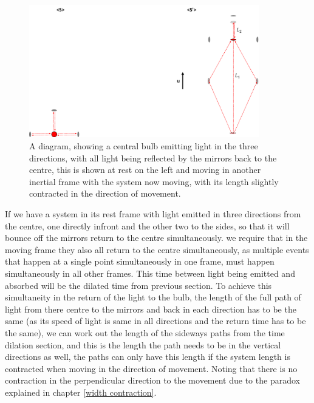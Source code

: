 \begin{figure}[H]
	\centering
	\includegraphics[width=10cm]{images/pdf/Length_Contraction.pdf}
	\caption{A diagram, showing a central bulb emitting light in the three directions, with all light being reflected by the mirrors back to the centre, this is shown at rest on the left and moving in another inertial frame with the system now moving, with its length slightly contracted in the direction of movement.}
	\label{fig: length contraction math}
\end{figure}

If we have a system in its rest frame with light emitted in three directions from the centre, one directly infront and the other two to the sides, so that it will bounce off the mirrors return to the centre simultaneously. we require that in the moving frame they also all return to the centre simultaneously, as multiple events that happen at a single point simultaneously in one frame, must happen simultaneously in all other frames. This time between light being emitted and absorbed will be the dilated time from previous section. To achieve this simultaneity in the return of the light to the bulb, the length of the full path of light from there centre to the mirrors and back in each direction has to be the same (as its speed of light is same in all directions and the return time has to be the same), we can work out the length of the sideways paths from the time dilation section, and this is the length the path needs to be in the vertical directions as well, the paths can only have this length if the system length is contracted when moving in the direction of movement. Noting that there is no contraction in the perpendicular direction to the movement due to the paradox explained in chapter \ref{width contraction}.

